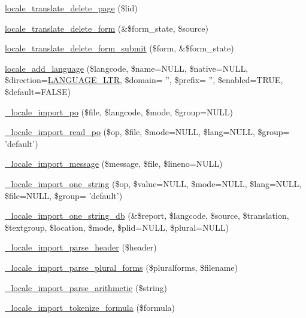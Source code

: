 \begin{CompactItemize}
\item 
\hyperlink{group__locale_gde9664489526c09d68def1897631f4fa}{locale\_\-translate\_\-delete\_\-page} (\$lid)
\item 
\hyperlink{group__locale_g2e1074d7d1c8bf96ffa578da3f0e4979}{locale\_\-translate\_\-delete\_\-form} (\&\$form\_\-state, \$source)
\item 
\hyperlink{group__locale_g26d7aa049b06d9de384175698f5761c7}{locale\_\-translate\_\-delete\_\-form\_\-submit} (\$form, \&\$form\_\-state)
\item 
\hyperlink{group__locale_g9fc28b9f10f5aaa7cb733dc0145018a2}{locale\_\-add\_\-language} (\$langcode, \$name=NULL, \$native=NULL, \$direction=\hyperlink{bootstrap_8inc_8790965df4de009fe8bdcf17f6a5c738}{LANGUAGE\_\-LTR}, \$domain= '', \$prefix= '', \$enabled=TRUE, \$default=FALSE)
\item 
\hyperlink{group__locale_g5d3d163017bea9499839ef6be09807de}{\_\-locale\_\-import\_\-po} (\$file, \$langcode, \$mode, \$group=NULL)
\item 
\hyperlink{group__locale_g97099fd0b115843fd4d443686a3ca35d}{\_\-locale\_\-import\_\-read\_\-po} (\$op, \$file, \$mode=NULL, \$lang=NULL, \$group= 'default')
\item 
\hyperlink{group__locale_ga6bdc2dc6954e30cabefa65ca596e9d0}{\_\-locale\_\-import\_\-message} (\$message, \$file, \$lineno=NULL)
\item 
\hyperlink{group__locale_gc065dc774e2258493b661c45c455c709}{\_\-locale\_\-import\_\-one\_\-string} (\$op, \$value=NULL, \$mode=NULL, \$lang=NULL, \$file=NULL, \$group= 'default')
\item 
\hyperlink{group__locale_g9f159bc412475f146434c43b69d0ab89}{\_\-locale\_\-import\_\-one\_\-string\_\-db} (\&\$report, \$langcode, \$source, \$translation, \$textgroup, \$location, \$mode, \$plid=NULL, \$plural=NULL)
\item 
\hyperlink{group__locale_g1381fc54e922fe478d8ee5cfbe0c3c16}{\_\-locale\_\-import\_\-parse\_\-header} (\$header)
\item 
\hyperlink{group__locale_g0fedb2e69527b0887ce2e5742488d8c2}{\_\-locale\_\-import\_\-parse\_\-plural\_\-forms} (\$pluralforms, \$filename)
\item 
\hyperlink{group__locale_gfec8dc8c1a6f8a0c70b5280c3a520c63}{\_\-locale\_\-import\_\-parse\_\-arithmetic} (\$string)
\item 
\hyperlink{group__locale_g53c242ca7adfb5ccc25ebfedab8214a5}{\_\-locale\_\-import\_\-tokenize\_\-formula} (\$formula)
\item 

\end{CompactItemize}
